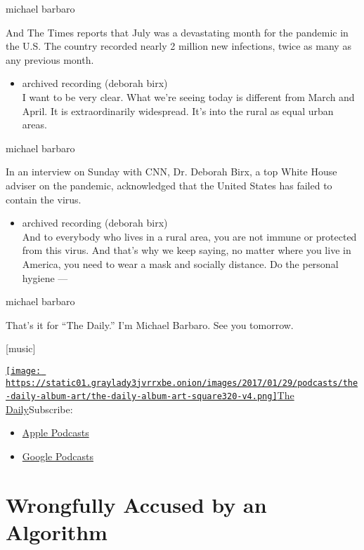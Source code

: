 michael barbaro

And The Times reports that July was a devastating month for the pandemic
in the U.S. The country recorded nearly 2 million new infections, twice
as many as any previous month.

\begin{itemize}
\tightlist
\item
  archived recording (deborah birx)\\
  I want to be very clear. What we're seeing today is different from
  March and April. It is extraordinarily widespread. It's into the rural
  as equal urban areas.
\end{itemize}

michael barbaro

In an interview on Sunday with CNN, Dr. Deborah Birx, a top White House
adviser on the pandemic, acknowledged that the United States has failed
to contain the virus.

\begin{itemize}
\tightlist
\item
  archived recording (deborah birx)\\
  And to everybody who lives in a rural area, you are not immune or
  protected from this virus. And that's why we keep saying, no matter
  where you live in America, you need to wear a mask and socially
  distance. Do the personal hygiene ---
\end{itemize}

michael barbaro

That's it for ``The Daily.'' I'm Michael Barbaro. See you tomorrow.

{[}music{]}

\href{https://www.nytimes3xbfgragh.onion/column/the-daily}{\texttt{[image: https://static01.graylady3jvrrxbe.onion/images/2017/01/29/podcasts/the-daily-album-art/the-daily-album-art-square320-v4.png]}The
Daily}Subscribe:

\begin{itemize}
\tightlist
\item
  \href{https://itunes.apple.com/us/podcast/id1200361736}{Apple
  Podcasts}
\item
  \href{https://www.google.com/podcasts?feed=aHR0cHM6Ly9yc3MuYXJ0MTkuY29tL3RoZS1kYWlseQ\%3D\%3D}{Google
  Podcasts}
\end{itemize}

\hypertarget{wrongfully-accused-by-an-algorithm-1}{%
\section{Wrongfully Accused by an
Algorithm}\label{wrongfully-accused-by-an-algorithm-1}}

